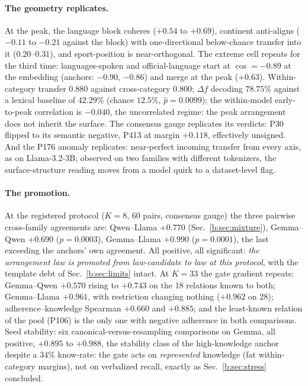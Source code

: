 \documentclass[11pt]{article}
\begin{document}
\paragraph{The geometry replicates.} At the peak, the language block
coheres ($+0.54$ to $+0.69$), continent anti-aligns ($-0.11$ to $-0.21$
against the block) with one-directional below-chance transfer into it
($0.20$--$0.31$), and sport-position is near-orthogonal. The extreme cell
repeats for the third time: languages-spoken and official-language start
at $\cos = -0.89$ at the embedding (anchors: $-0.90$, $-0.86$) and merge
at the peak ($+0.63$). Within-category transfer $0.880$ against
cross-category $0.800$; $\Delta f$ decoding $78.75\%$ against a lexical
baseline of $42.29\%$ (chance $12.5\%$, $\hat p = 0.0099$); the
within-model early-to-peak correlation is $-0.040$, the uncorrelated
regime: the peak arrangement does not inherit the surface. The consensus
gauge replicates its verdicts: P30 flipped to its semantic negative, P413
at margin $+0.118$, effectively unsigned. And the P176 anomaly
replicates: near-perfect incoming transfer from every axis, as on
Llama-3.2-3B; observed on two families with different tokenizers, the
surface-structure reading moves from a model quirk to a dataset-level
flag.

\paragraph{The promotion.} At the registered protocol ($K{=}8$, $60$
pairs, consensus gauge) the three pairwise cross-family agreements are:
Qwen--Llama $+0.770$ (Sec.~\ref{b:sec:mixture}), Gemma--Qwen $+0.690$
($p = 0.0003$), Gemma--Llama $+0.990$ ($p = 0.0001$), the last exceeding
the anchors' own agreement. All positive, all significant: \emph{the
arrangement law is promoted from law-candidate to law at this protocol},
with the template debt of Sec.~\ref{b:sec:limits} intact. At $K{=}33$ the
gate gradient repeats: Gemma--Qwen $+0.570$ rising to $+0.743$ on the
$18$ relations known to both; Gemma--Llama $+0.961$, with restriction
changing nothing ($+0.962$ on $28$); adherence--knowledge Spearman
$+0.660$ and $+0.885$; and the least-known relation of the pool (P106) is
the only one with negative adherence in both comparisons. Seed stability:
six canonical-versus-resampling comparisons on Gemma, all positive,
$+0.895$ to $+0.988$, the stability class of the high-knowledge anchor
despite a $34\%$ know-rate: the gate acts on \emph{represented} knowledge
(fat within-category margins), not on verbalized recall, exactly as
Sec.~\ref{b:sec:stress} concluded.
\end{document}
